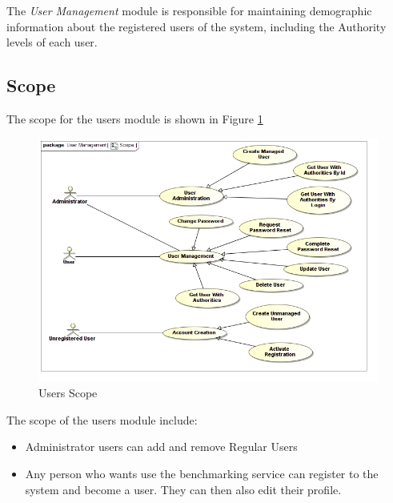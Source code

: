The \textit{User Management} module is responsible for maintaining demographic information
about the registered users of the system, including the Authority levels of each
user.



\subsection{Scope}
The scope for the users module is shown in Figure \ref{Users Scope}
\begin{figure}[H]
  \begin{center}
  \includegraphics[scale=0.4]{../Diagrams and Charts/User Management/Scope.jpg}
  \caption{Users Scope}
  \end{center}
  \label{Users Scope}
\end{figure}
The scope of the users module include:
\begin{itemize}
	\item Administrator users can add and remove Regular Users
	\item Any person who wants use the benchmarking service can register
	to the system and become a user. They can then also edit
	their profile.
\end{itemize}



